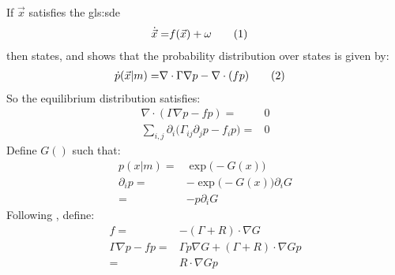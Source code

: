 \documentclass[]{article}
\newcommand\numberthis{\addtocounter{equation}{1}\tag{\theequation}}
\begin{document}
If $\vec{x}$ satisfies the \gls{gls:sde}
\begin{align*}
	\dot{\vec{x}} =& f(\vec{x}) + \omega \numberthis \label{eq:dynamics}
\end{align*}
then \cite[(2.2)]{friston_life_2013} states, and  \cite[Chapter 33]{cvitanovic2005chaos} shows that the probability distribution over states is given by:
\begin{align*}
	\dot{p}(\vec{x}\vert m) =& \nabla \cdot \Gamma \nabla p -\nabla \cdot(f p) \numberthis \label{eq:fokker:planck}
\end{align*}
So the equilibrium distribution satisfies:
\begin{align*}
	\nabla \cdot (\Gamma \nabla p -f p)=&0\\
	\sum_{i,j}\partial_i \big(\Gamma_{ij} \partial_j p -f_i p \big)=& 0
\end{align*}
Define $G()$ such that:
\begin{align*}
	p(x\vert m) =& \exp \big(-G(x)\big)\\
	\partial_i p =& - \exp \big(-G(x)\big) \partial_i G\\
	=& - p \partial_i G
\end{align*}
Following \cite[(2.3)]{friston_life_2013}, define:
\begin{align*}
	f =& -(\Gamma + R) \cdot \nabla G\\
	\Gamma \nabla p - f p =& \Gamma p \nabla G + (\Gamma + R) \cdot \nabla G p\\
	=& R \cdot \nabla G p
\end{align*}
\cite{friston2012free}

\appendix

\printglossaries




\end{document}
